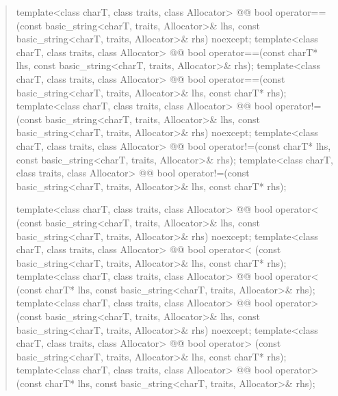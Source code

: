 \documentclass{wg21}
\begin{document}
\begin{quote}
\begin{codeblock}
{  template<class charT, class traits, class Allocator>
    @@
    bool operator==(const basic_string<charT, traits, Allocator>& lhs,
                    const basic_string<charT, traits, Allocator>& rhs) noexcept;
  template<class charT, class traits, class Allocator>
    @@
    bool operator==(const charT* lhs,
                    const basic_string<charT, traits, Allocator>& rhs);
  template<class charT, class traits, class Allocator>
    @@
    bool operator==(const basic_string<charT, traits, Allocator>& lhs,
                    const charT* rhs);
  template<class charT, class traits, class Allocator>
    @@
    bool operator!=(const basic_string<charT, traits, Allocator>& lhs,
                    const basic_string<charT, traits, Allocator>& rhs) noexcept;
  template<class charT, class traits, class Allocator>
    @@
    bool operator!=(const charT* lhs,
                    const basic_string<charT, traits, Allocator>& rhs);
  template<class charT, class traits, class Allocator>
    @@
    bool operator!=(const basic_string<charT, traits, Allocator>& lhs,
                    const charT* rhs);

  template<class charT, class traits, class Allocator>
    @@
    bool operator< (const basic_string<charT, traits, Allocator>& lhs,
                    const basic_string<charT, traits, Allocator>& rhs) noexcept;
  template<class charT, class traits, class Allocator>
    @@
    bool operator< (const basic_string<charT, traits, Allocator>& lhs,
                    const charT* rhs);
  template<class charT, class traits, class Allocator>
    @@
    bool operator< (const charT* lhs,
                    const basic_string<charT, traits, Allocator>& rhs);
  template<class charT, class traits, class Allocator>
    @@
    bool operator> (const basic_string<charT, traits, Allocator>& lhs,
                    const basic_string<charT, traits, Allocator>& rhs) noexcept;
  template<class charT, class traits, class Allocator>
    @@
    bool operator> (const basic_string<charT, traits, Allocator>& lhs,
                    const charT* rhs);
  template<class charT, class traits, class Allocator>
    @@
    bool operator> (const charT* lhs,
                    const basic_string<charT, traits, Allocator>& rhs);

}
\end{codeblock}
\end{quote}
\end{document}
